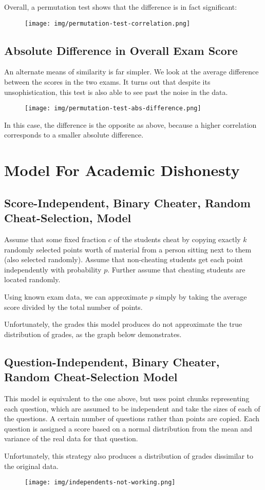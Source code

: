 \documentclass{article}
\begin{document}
        Overall, a permutation test shows that the difference is in fact significant:
        \begin{figure}[h!]
            \centering
            \texttt{[image: img/permutation-test-correlation.png]}
        \end{figure}
    \subsection{Absolute Difference in Overall Exam Score}
        An alternate means of similarity is far simpler. We look at the average difference
            between the scores in the two exams. It turns out that despite its unsophistication,
            this test is also able to see past the noise in the data.
        \begin{figure}[h!]
            \centering
            \texttt{[image: img/permutation-test-abs-difference.png]}
        \end{figure}

        In this case, the difference is the opposite as above, because a higher correlation
            corresponds to a smaller absolute difference.
\section{Model For Academic Dishonesty}
    \subsection{Score-Independent, Binary Cheater, Random Cheat-Selection, Model}
        Assume that some fixed fraction $c$ of the students cheat by copying exactly $k$
            randomly selected points worth of material from a person sitting next to them (also
            selected randomly). Assume that non-cheating students get each point independently
            with probability $p$. Further assume that cheating students are located randomly.

        Using known exam data, we can approximate $p$ simply by taking the average score divided
            by the total number of points.

        Unfortunately, the grades this model produces do not approximate the true distribution
            of grades, as the graph below demonstrates.

    \subsection{Question-Independent, Binary Cheater, Random Cheat-Selection Model}
        This model is equivalent to the one above, but uses point chunks representing each
            question, which are assumed to be independent and take the sizes of each of the
            questions. A certain number of questions rather than points are copied. Each question
            is assigned a score based on a normal distribution from the mean and variance of
            the real data for that question.

        Unfortunately, this strategy also produces a distribution of grades dissimilar to the
            original data.

        \begin{figure}[h!]
            \centering
            \texttt{[image: img/independents-not-working.png]}
        \end{figure}
\end{document}

